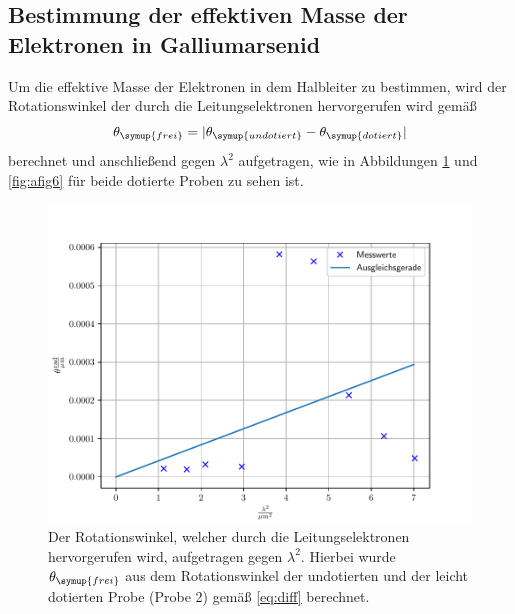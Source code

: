 \subsection{Bestimmung der effektiven Masse der Elektronen in Galliumarsenid}
Um die effektive Masse der Elektronen in dem Halbleiter zu bestimmen, wird der Rotationswinkel der durch die Leitungselektronen hervorgerufen wird gemäß
\begin{equation}
    \theta_{\symup{frei}} = |\theta_{\symup{undotiert}}-\theta_{\symup{dotiert}}| \label{eq:diff}
\end{equation}
berechnet und anschließend gegen $\lambda^2$ aufgetragen, wie in Abbildungen \ref{fig:afig5} und \ref{fig:afig6} für beide dotierte Proben zu sehen ist. 

\noindent
\FloatBarrier
\begin{figure}[h]
    \centering
    \includegraphics[width=1\textwidth]{Winkel_frei1.pdf}
    \caption{Der Rotationswinkel, welcher durch die Leitungselektronen hervorgerufen wird, aufgetragen gegen $\lambda^2$. Hierbei wurde $\theta_{\symup{frei}}$ aus dem Rotationswinkel der undotierten und der leicht dotierten Probe (Probe 2) gemäß \ref{eq:diff} berechnet.}
    \label{fig:afig5}
\end{figure}
\FloatBarrier
\noindent
\noindent
\FloatBarrier

